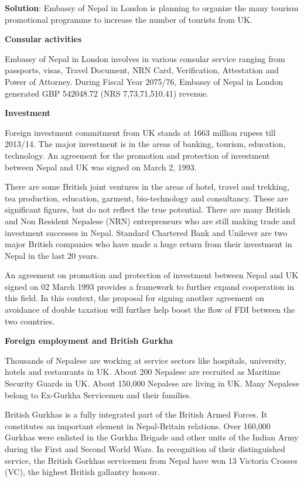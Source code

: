\documentclass[
]{book}
\newenvironment{solution}{ {\bfseries Solution}:}{}
\begin{document}
\begin{solution}
Embassy of Nepal in London is planning to organize the many tourism promotional programme to increase the number of tourists from UK.

\textbf{Consular activities}

Embassy of Nepal in London involves in various consular service ranging from passports, visas, Travel Document, NRN Card, Verification, Attestation and Power of Attorney. During Fiscal Year 2075/76, Embassy of Nepal in London generated GBP 542048.72 (NRS 7,73,71,510.41) revenue.

\textbf{Investment}

Foreign investment commitment from UK stands at 1663 million rupees till 2013/14. The major investment is in the areas of banking, tourism, education, technology. An agreement for the promotion and protection of investment between Nepal and UK was signed on March 2, 1993.

There are some British joint ventures in the areas of hotel, travel and trekking, tea production, education, garment, bio-technology and consultancy. These are significant figures, but do not reflect the true potential. There are many British and Non Resident Nepalese (NRN) entrepreneurs who are still making trade and investment successes in Nepal. Standard Chartered Bank and Unilever are two major British companies who have made a huge return from their investment in Nepal in the last 20 years.

An agreement on promotion and protection of investment between Nepal and UK signed on 02 March 1993 provides a framework to further expand cooperation in this field. In this context, the proposal for signing another agreement on avoidance of double taxation will further help boost the flow of FDI between the two countries.

\textbf{Foreign employment and British Gurkha}

Thousands of Nepalese are working at service sectors like hospitals, university, hotels and restaurants in UK. About 200 Nepalese are recruited as Maritime Security Guards in UK. About 150,000 Nepalese are living in UK. Many Nepalese belong to Ex-Gurkha Servicemen and their families.

British Gurkhas is a fully integrated part of the British Armed Forces. It constitutes an important element in Nepal-Britain relations.  Over 160,000 Gurkhas were enlisted in the Gurkha Brigade and other units of the Indian Army during the First and Second World Wars. In recognition of their distinguished service, the British Gorkhas servicemen from Nepal have won 13 Victoria Crosses (VC), the highest British gallantry honour.


\end{solution}
\end{document}
